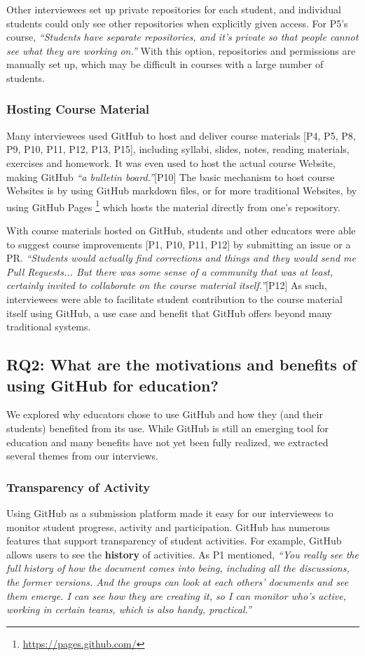 Other interviewees set up private repositories for each student, and individual students could only see other repositories when explicitly given access. For P5's course, \textit{``Students have separate repositories, and it's private so that people cannot see what they are working on.''} With this option, repositories and permissions are manually set up, which may be difficult in courses with a large number of students.

\subsubsection{Hosting Course Material}
Many interviewees used GitHub to host and deliver course materials [P4, P5, P8, P9, P10, P11, P12, P13, P15], including syllabi, slides, notes, reading materials, exercises and homework. It was even used to host the actual course Website, making GitHub \textit{``a bulletin board.''}[P10] The basic mechanism to host course Websites is by using GitHub markdown files, or for more traditional Websites, by using GitHub Pages \footnote{\url{https://pages.github.com/}} which hosts the material directly from one's repository.

With course materials hosted on GitHub, students and other educators were able to suggest course improvements [P1, P10, P11, P12] by submitting an issue or a PR. \textit{``Students would actually find corrections and things and they would send me Pull Requests... But there was some sense of a community that was at least, certainly invited to collaborate on the course material itself.''}[P12] As such, interviewees were able to facilitate student contribution to the course material itself using GitHub, a use case and benefit that GitHub offers beyond many traditional systems.

\subsection{RQ2: What are the motivations and benefits of using GitHub for education?}

We explored why educators chose to use GitHub and how they (and their students) benefited from its use. While GitHub is still an emerging tool for education and many benefits have not yet been fully realized, we extracted several themes from our interviews.

\subsubsection{Transparency of Activity}
Using GitHub as a submission platform made it easy for our interviewees to monitor student progress, activity and participation. GitHub has numerous features that support transparency of student activities. For example, GitHub allows users to see the \textbf{history} of activities. As P1 mentioned, \textit{``You really see the full history of how the document comes into being, including all the discussions, the former versions. And the groups can look at each others' documents and see them emerge. I can see how they are creating it, so I can monitor who's active, working in certain teams, which is also handy, practical.''}

